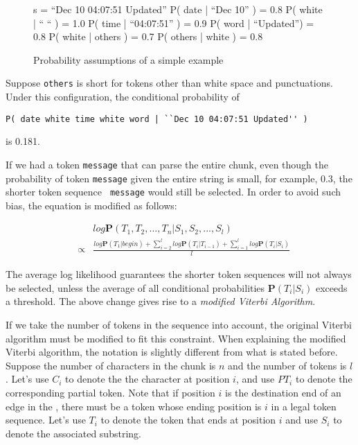 \begin{figure}[t]
\begin{centercode}
s  = ``Dec 10 04:07:51 Updated''
P( date | ``Dec 10'' ) = 0.8
P( white | `` `` ) = 1.0
P( time | ``04:07:51'' ) = 0.9
P( word | ``Updated'') = 0.8
P( white | others ) = 0.7
P( others | white ) = 0.8
\end{centercode}
\caption{Probability assumptions of a simple example}
\end{figure}

Suppose {\tt others} is short for tokens other than white space and
punctuations. Under this configuration, the conditional probability
of
\begin{verbatim}
P( date white time white word | ``Dec 10 04:07:51 Updated'' ) 
\end{verbatim}
is 0.181.

If we had a token {\tt message} that can parse the entire chunk,
even though the probability of token {\tt message} given the entire
string is small, for example, 0.3, the shorter token sequence {\tt
message} would still be selected. In order to avoid such bias, the
equation is modified as follows:

\begin{eqnarray*}
&& log \mathbf{P}(T_1, T_2, ..., T_n|S_1, S_2, ..., S_l) \\ 
& \propto & \frac{log \mathbf{P}(T_1|begin) +
\sum_{i=2}^{l}log \mathbf{P}(T_i|T_{i-1}) + \sum_{i=1}^{l}log
\mathbf{P}(T_i|S_i)}{l}
\end{eqnarray*}

The average log likelihood guarantees the shorter token sequences
will not always be selected, unless the average of all conditional
probabilities $\mathbf{P}(T_i|S_i)$ exceeds a threshold.
The above change gives rise to a {\em modified Viterbi Algorithm}.

If we take the number of tokens in the sequence into account, the original
Viterbi algorithm must be modified to fit this constraint. When
explaining the modified Viterbi algorithm, the notation is slightly
different from what is stated before. Suppose the number of characters
in the chunk is $n$ and the number of tokens is $l$. Let's use $C_i$
to denote the the character at
position $i$, and use $PT_i$ to denote the corresponding partial
token. Note that if position $i$ is the destination end of an edge in
the \seqset{}, there must be a token whose ending position is
$i$ in a legal token sequence. Let's use $T_i$ to denote the token
that ends at position $i$ and
use $S_i$ to denote the associated substring. 

